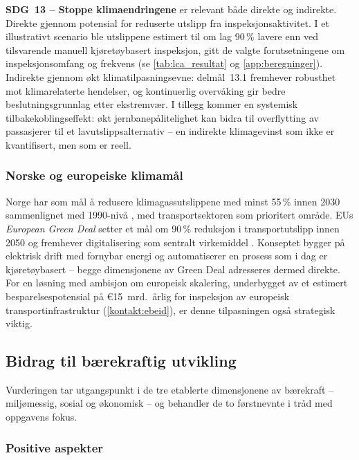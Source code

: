 \textbf{SDG~13 – Stoppe klimaendringene} er relevant både direkte og indirekte. Direkte gjennom potensial for reduserte utslipp fra inspeksjonsaktivitet. I et illustrativt scenario ble utslippene estimert til om lag 90\,\% lavere enn ved tilsvarende manuell kjøretøybasert inspeksjon, gitt de valgte forutsetningene om inspeksjonsomfang og frekvens (se \cref{tab:lca_resultat} og \cref{app:beregninger}). Indirekte gjennom økt klimatilpasningsevne: delmål~13.1 fremhever robusthet mot klimarelaterte hendelser, og kontinuerlig overvåking gir bedre beslutningsgrunnlag etter ekstremvær. I tillegg kommer en systemisk tilbakekoblingseffekt: økt jernbanepålitelighet kan bidra til overflytting av passasjerer til et lavutslippsalternativ -- en indirekte klimagevinst som ikke er kvantifisert, men som er reell.

\subsubsection{Norske og europeiske klimamål}

Norge har som mål å redusere klimagassutslippene med minst 55\,\% innen 2030 sammenlignet med 1990-nivå \parencite{miljodirektoratet_klimamal}, med transportsektoren som prioritert område. EUs \textit{European Green Deal} setter et mål om 90\,\% reduksjon i transportutslipp innen 2050 og fremhever digitalisering som sentralt virkemiddel \parencite{ec_green_deal}. Konseptet bygger på elektrisk drift med fornybar energi og automatiserer en prosess som i dag er kjøretøybasert -- begge dimensjonene av Green Deal adresseres dermed direkte. For en løsning med ambisjon om europeisk skalering, underbygget av et estimert besparelsespotensial på €15~mrd.\ årlig for inspeksjon av europeisk transportinfrastruktur (\cref{kontakt:ebeid}), er denne tilpasningen også strategisk viktig.

\subsection{Bidrag til bærekraftig utvikling}

Vurderingen tar utgangspunkt i de tre etablerte dimensjonene av bærekraft -- miljømessig, sosial og økonomisk -- og behandler de to førstnevnte i tråd med oppgavens fokus.

\subsubsection{Positive aspekter}

